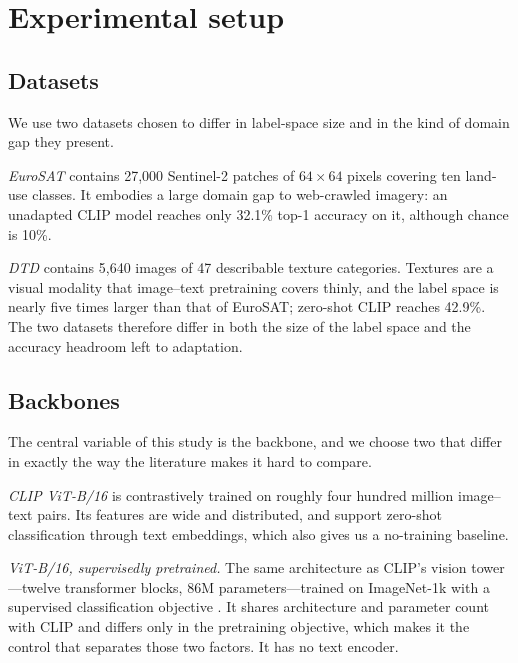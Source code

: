 \documentclass[preprint,12pt]{elsarticle}
\begin{document}
\section{Experimental setup}
\label{sec:setup}

\subsection{Datasets}

We use two datasets chosen to differ in label-space size and in the kind of
domain gap they present.

\emph{EuroSAT} \cite{helber2019eurosat} contains 27{,}000 Sentinel-2 patches of
$64\times64$ pixels covering ten land-use classes. It embodies a large domain
gap to web-crawled imagery: an unadapted CLIP model reaches only 32.1\% top-1
accuracy on it, although chance is 10\%.

\emph{DTD} \cite{cimpoi2014dtd} contains 5{,}640 images of 47 describable
texture categories. Textures are a visual modality that image--text pretraining
covers thinly, and the label space is nearly five times larger than that of
EuroSAT; zero-shot CLIP reaches 42.9\%. The two datasets therefore differ in
both the size of the label space and the accuracy headroom left to adaptation.

\subsection{Backbones}

The central variable of this study is the backbone, and we choose two that
differ in exactly the way the literature makes it hard to compare.

\emph{CLIP ViT-B/16} \cite{radford2021clip} is contrastively trained on roughly
four hundred million image--text pairs. Its features are wide and distributed,
and support zero-shot classification through text embeddings, which also gives
us a no-training baseline.

\emph{ViT-B/16, supervisedly pretrained.} The same architecture as CLIP's
vision tower---twelve transformer blocks, 86M parameters---trained on ImageNet-1k
with a supervised classification objective \cite{dosovitskiy2021vit}. It shares
architecture and parameter count with CLIP and differs only in the pretraining
objective, which makes it the control that separates those two factors. It has no
text encoder.
\end{document}
